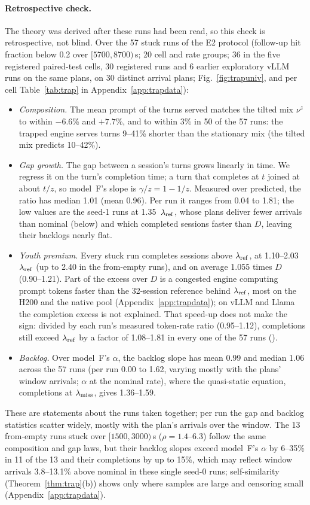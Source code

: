 \paragraph{Retrospective check.} The theory was derived after these runs had been read, so this check is retrospective, not
blind. Over the 57 stuck runs of the E2 protocol (follow-up hit fraction below 0.2 over $[5700,8700)$\,s; 20 cell and rate groups;
36 in the five registered paired-test cells, 30 registered runs and 6 earlier exploratory vLLM runs on the same plans, on 30
distinct arrival plans; Fig.~\ref{fig:trapuniv}, and per cell Table~\ref{tab:trap} in
Appendix~\ref{app:trapdata}):
\begin{itemize}[leftmargin=*,nosep]
\item \emph{Composition.} The mean prompt of the turns served matches the tilted mix $\nu^z$ to within $-6.6$\% and $+7.7$\%,
and to within 3\% in 50 of the 57 runs: the trapped engine serves turns 9--41\% shorter than the stationary mix (the tilted mix predicts 10--42\%).
\item \emph{Gap growth.} The gap between a session's turns grows linearly in time. We regress it on the turn's completion time;
a turn that completes at $t$ joined at about $t/z$, so model~F's slope is $\gamma/z=1-1/z$. Measured over predicted, the ratio has
median 1.01 (mean 0.96). Per run it ranges from 0.04 to 1.81; the low values are the seed-1 runs at 1.35~$\lambda_{\mathrm{ref}}$, whose plans
deliver fewer arrivals than nominal (below) and which completed sessions faster than $D$, leaving their backlogs nearly flat.
\item \emph{Youth premium.} Every stuck run completes sessions above $\lambda_{\mathrm{ref}}$, at 1.10--2.03~$\lambda_{\mathrm{ref}}$ (up to 2.40 in the from-empty
runs), and on average 1.055 times $D$ (0.90--1.21). Part of the excess over $D$ is a congested engine computing prompt tokens faster
than the 32-session reference behind $\lambda_{\mathrm{ref}}$, most on the H200 and the native pool (Appendix~\ref{app:trapdata}); on vLLM and Llama
the completion excess is not explained. That speed-up does not make the sign: divided by each run's measured token-rate ratio
(0.95--1.12), completions still exceed $\lambda_{\mathrm{ref}}$ by a factor of 1.08--1.81 in every one of the 57 runs
().
\item \emph{Backlog.} Over model~F's $\alpha$, the backlog slope has mean 0.99 and median 1.06 across the 57 runs (per run 0.00
to 1.62, varying mostly with the plans' window arrivals; $\alpha$ at the nominal rate), where the quasi-static equation, completions
at $\lambda_{\mathrm{miss}}$, gives 1.36--1.59.
\end{itemize}
These are statements about the runs taken together; per run the gap and backlog statistics scatter widely, mostly with the plan's
arrivals over the window. The 13 from-empty runs stuck over $[1500,3000)$\,s ($\rho=1.4$--6.3) follow the same composition and gap
laws, but their backlog slopes exceed model~F's $\alpha$ by 6--35\% in 11 of the 13 and their completions by up to 15\%, which may
reflect window arrivals 3.8--13.1\% above nominal in these single seed-0 runs; self-similarity (Theorem~\ref{thm:trap}(b)) shows only
where samples are large and censoring small (Appendix~\ref{app:trapdata}).

